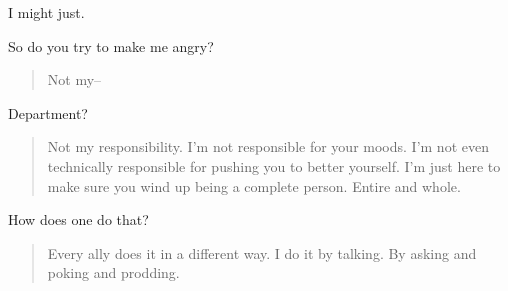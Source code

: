 I might just.

So do you try to make me angry?

\begin{quote}
Not my--
\end{quote}

Department?

\begin{quote}
Not my responsibility. I'm not responsible for your moods. I'm not even technically responsible for pushing you to better yourself. I'm just here to make sure you wind up being a complete person. Entire and whole.
\end{quote}

How does one do that?

\begin{quote}
Every ally does it in a different way. I do it by talking. By asking and poking and prodding.
\end{quote}
